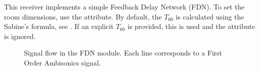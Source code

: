 This receiver implements a simple Feedback Delay Network (FDN). To set
the room dimensions, use the  attribute. By default,
the $T_{60}$ is calculated using the Sabine's formula, see
. If an explicit $T_{60}$ is provided, this is used
and the  attribute is ignored.

\begin{figure}[htb]
\centering
{}
\caption{Signal flow in the FDN module. Each line corresponds to a First Order Ambisonics signal.}
\label{fig:fdn}
\end{figure}


